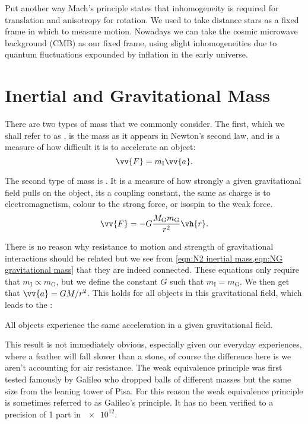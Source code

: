 \documentclass[fleqn]{NotesClass}
\begin{document}
    Put another way Mach's principle states that inhomogeneity is required for translation and anisotropy for rotation.
    We used to take distance stars as a fixed frame in which to measure motion.
    Nowadays we can take the cosmic microwave background (CMB) as our fixed frame, using slight inhomogeneities due to quantum fluctuations expounded by inflation in the early universe.
    
    \section{Inertial and Gravitational Mass}
    There are two types of mass that we commonly consider.
    The first, which we shall refer to as , is the mass as it appears in Newton's second law, and is a measure of how difficult it is to accelerate an object:
    \begin{equation}\label{eqn:N2 inertial mass}
        \vv{F} = m_{\mathrm{I}}\vv{a}.
    \end{equation}
    
    The second type of mass is .
    It is a measure of how strongly a given gravitational field pulls on the object, its a coupling constant, the same as charge is to electromagnetism, colour to the strong force, or isospin to the weak force.
    \begin{equation}\label{eqn:NG gravitational mass}
        \vv{F} = -G\frac{M_{\mathrm{G}}m_{\mathrm{G}}}{r^2}\vh{r}.
    \end{equation}
    
    There is no reason why resistance to motion and strength of gravitational interactions should be related but we see from \cref{eqn:N2 inertial mass,eqn:NG gravitational mass} that they are indeed connected.
    These equations only require that \(m_{\mathrm{I}} \propto m_{\mathrm{G}}\), but we define the constant \(G\) such that \(m_{\mathrm{I}} = m_{\mathrm{G}}\).
    We then get that \(\vv{a} = GM/r^2\).
    This holds for all objects in this gravitational field, which leads to the :
    \begin{important}
        All objects experience the same acceleration in a given gravitational field.
    \end{important}
    
    This result is not immediately obvious, especially given our everyday experiences, where a feather will fall slower than a stone, of course the difference here is we aren't accounting for air resistance.
    The weak equivalence principle was first tested famously by Galileo who dropped balls of different masses but the same size from the leaning tower of Pisa.
    For this reason the weak equivalence principle is sometimes referred to as Galileo's principle.
    It has no been verified to a precision of 1 part in \(\num{e12}\).
    
\end{document}
